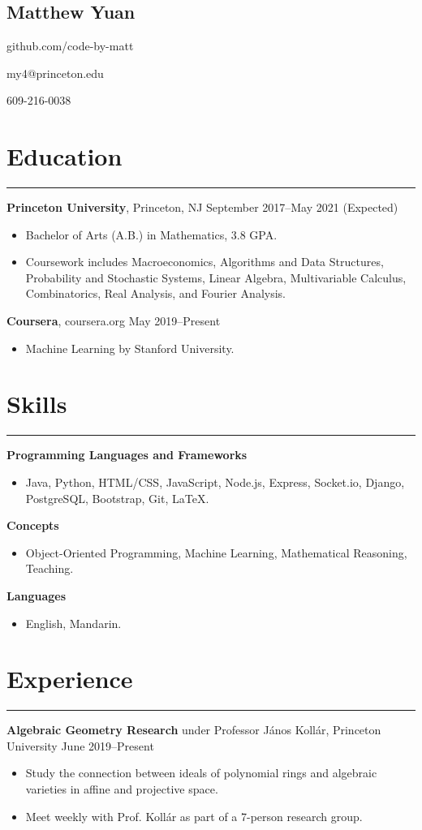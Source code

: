 \documentclass[11pt]{article}
\newcommand{\name}[1]{\begin{center}\section*{\huge #1}\end{center}}
\newcommand{\topinfo}[1]{\begin{center}\vspace{-0.2cm}#1\vspace{-0.2cm}\end{center}}
\newcommand{\resumesection}[1]{\vspace{-0.2cm}\section*{#1}\vspace{-0.2cm}\hrule\vspace{0.2cm}}
\begin{document}
\name{Matthew Yuan}
\topinfo{github.com/code-by-matt}
\topinfo{my4@princeton.edu}
\topinfo{609-216-0038}

\resumesection{Education}

\textbf{Princeton University}, Princeton, NJ \hfill September 2017--May 2021 (Expected)
\begin{itemize}
	\item Bachelor of Arts (A.B.) in Mathematics, 3.8 GPA.
	\item Coursework includes Macroeconomics, Algorithms and Data Structures, Probability and Stochastic Systems, Linear Algebra, Multivariable Calculus, Combinatorics, Real Analysis, and Fourier Analysis.
\end{itemize}

\textbf{Coursera}, coursera.org \hfill May 2019--Present
\begin{itemize}
	\item Machine Learning by Stanford University.
\end{itemize}

\resumesection{Skills}

\textbf{Programming Languages and Frameworks}
\begin{itemize}
	\item Java, Python, HTML/CSS, JavaScript, Node.js, Express, Socket.io, Django, PostgreSQL, Bootstrap, Git, \LaTeX.
\end{itemize}

\textbf{Concepts}
\begin{itemize}
	\item Object-Oriented Programming, Machine Learning, Mathematical Reasoning, Teaching.
\end{itemize}

\textbf{Languages}
\begin{itemize}
	\item English, Mandarin.
\end{itemize}

\resumesection{Experience}

\textbf{Algebraic Geometry Research} under Professor J\'{a}nos Koll\'{a}r, Princeton University \hfill June 2019--Present
\begin{itemize}
	\item Study the connection between ideals of polynomial rings and algebraic varieties in affine and projective space.
	\item Meet weekly with Prof. Koll\'{a}r as part of a 7-person research group.
\end{itemize}
\end{document}
